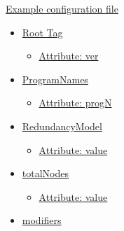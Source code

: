 \hyperlink{ardguide_sec_3_4_ardguide_sec_3_4_1}{Example configuration file}\begin{itemize}
\item \hyperlink{ardguide_sec_3_4_ardguide_sec_3_4_2}{Root Tag}\begin{itemize}
\item \hyperlink{ardguide_sec_3_4_ardguide_sec_3_4_2_1}{Attribute: ver}\end{itemize}
\item \hyperlink{ardguide_sec_3_4_ardguide_sec_3_4_3}{ProgramNames}\begin{itemize}
\item \hyperlink{ardguide_sec_3_4_ardguide_sec_3_4_3_1}{Attribute: progN}\end{itemize}
\item \hyperlink{ardguide_sec_3_4_ardguide_sec_3_4_4}{RedundancyModel}\begin{itemize}
\item \hyperlink{ardguide_sec_3_4_ardguide_sec_3_4_4_1}{Attribute: value}\end{itemize}
\item \hyperlink{ardguide_sec_3_4_ardguide_sec_3_4_5}{totalNodes}\begin{itemize}
\item \hyperlink{ardguide_sec_3_4_ardguide_sec_3_4_5_1}{Attribute: value}\end{itemize}
\item \hyperlink{ardguide_sec_3_4_ardguide_sec_3_4_6}{modifiers}\begin{itemize}

\end{itemize}
\end{itemize}
